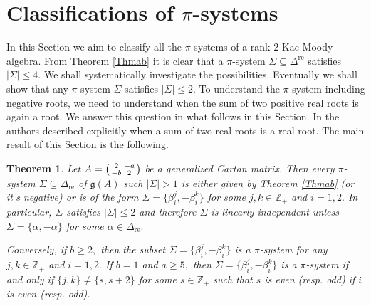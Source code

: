 \documentclass[12pt,reqno]{amsart}
\theoremstyle{plain}
\newtheorem*{thm}{Theorem}
\theoremstyle{definition}
\theoremstyle{remark}
\newcommand{\lie}[1]{\mathfrak{#1}}
\newcommand\bz{\mathbb Z}
\begin{document}
\section{Classifications of \texorpdfstring{$\pi$}{pi}-systems} \label{clpisystems}
In this Section we aim to classify all the $\pi$-systems of a rank $2$ Kac-Moody algebra. From Theorem \ref{Thmab} it is clear that a $\pi$-system $\Sigma\subseteq \Delta^{\mathrm{re}}$ satisfies $|\Sigma|\le 4.$ We shall systematically investigate the possibilities. Eventually we shall show that any $\pi$-system $\Sigma$ satisfies $|\Sigma|\le 2.$ To understand the $\pi$-system including negative roots, we need to understand when the sum of two positive real roots is again a root. We answer this question in what follows in this Section. In \cite{carbone2021commutator} the authors described explicitly when a sum of two real roots is a real root. The main result of this Section is the following.
\begin{thm}\label{NThmab}
    Let $A= \begin{psmallmatrix} 2 & -a \\-b & 2 \end{psmallmatrix}$ be a generalized Cartan matrix. Then every $\pi$-system $\Sigma\subseteq\Delta_{\mathrm{re}}$ of $\lie g(A)$ such $|\Sigma|>1$ is either given by Theorem \ref{Thmab} (or it's negative) or is of the form $\Sigma=\{\beta_i^j,-\beta_i^k\}$ for some $j,k\in\bz_+$ and $i=1,2.$ In particular, $\Sigma$ satisfies $|\Sigma|\le 2$ and therefore $\Sigma$ is linearly independent unless $\Sigma=\{\alpha,-\alpha\}$ for some $\alpha\in\Delta^+_{\mathrm{re}}.$ 
    
    Conversely, if $b\geq 2,$ then the subset $\Sigma=\{\beta_i^j,-\beta_i^k\}$ is a $\pi$-system for any $j,k\in \bz_+$ and $i=1,2.$ If $b=1$ and $a\geq 5,$ then $\Sigma=\{\beta_i^j,-\beta_i^k\}$ is a $\pi$-system if and only if $\{j,k\}\neq \{s,s+2\}$ for some $s\in\bz_+$ such that $s$ is even (resp. odd)  if $i$ is even (resp. odd).
\end{thm}
\end{document}
